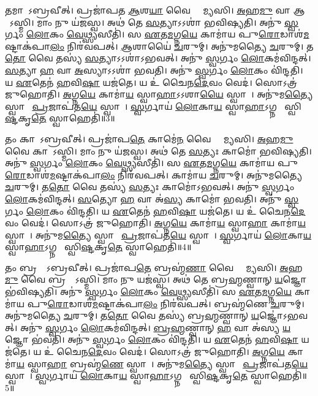    𑌤𑌮𑌾𑌶𑌾᳚𑌽𑌬𑍍𑌰𑌵𑍀𑌤𑍍।
   𑌪𑍍𑌰𑌜𑌾॑𑌪𑌤 \ul{𑌆}𑌶\ul{𑌯𑌾} 𑌵𑍈 𑌶𑍍𑌰𑌾᳚𑌮𑍍𑌯𑌸𑌿।
   \ul{𑌅}𑌹\ul{𑌮𑍁} 𑌵𑌾 𑌆𑌶𑌾᳚𑌽𑌸𑍍𑌮𑌿।
   𑌮𑌾𑌂 𑌨𑍁 𑌯॑𑌜𑌸𑍍𑌵।
   𑌅𑌥॑ 𑌤𑍇 \ul{𑌸}𑌤𑍍𑌯𑌾𑌽𑌽𑌶𑌾॑ 𑌭𑌵𑌿𑌷𑍍𑌯𑌤𑌿।
   𑌅𑌨𑍁॑ \ul{𑌸𑍍𑌵}𑌰𑍍𑌗𑌂 \ul{𑌲𑍋}𑌕𑌂 \ul{𑌵𑍇}𑌥𑍍𑌸𑍍𑌯𑌸𑍀𑌤𑌿॑।
   𑌸 \ul{𑌏}𑌤\ul{𑌮}𑌗𑍍𑌨\ul{𑌯𑍇} 𑌕𑌾𑌮𑌾॑𑌯 𑌪𑍁\ul{𑌰𑍋}𑌡𑌾𑌶॑\ul{𑌮}𑌷𑍍𑌟𑌾𑌕॑𑌪𑌾\ul{𑌲𑌂} 𑌨𑌿𑌰॑𑌵𑌪𑌤𑍍।
   \ul{𑌆}𑌶𑌾𑌯𑍈॑ \ul{𑌚}𑌰𑍁𑌮𑍍।
   𑌅𑌨𑍁॑𑌮𑌤𑍍𑌯𑍈 \ul{𑌚}𑌰𑍁𑌮𑍍।
   𑌤\ul{𑌤𑍋} 𑌵𑍈 𑌤𑌸𑍍𑌯॑ \ul{𑌸}𑌤𑍍𑌯𑌾𑌽𑌽𑌶𑌾॑𑌽𑌭𑌵𑌤𑍍।
   𑌅𑌨𑍁॑ \ul{𑌸𑍍𑌵}𑌰𑍍𑌗𑌂 \ul{𑌲𑍋}𑌕𑌮॑𑌵𑌿𑌨𑍍𑌦𑌤𑍍।
   \ul{𑌸}𑌤𑍍𑌯𑌾 \ul{𑌹} 𑌵𑌾 \ul{𑌅}𑌸𑍍𑌯𑌾𑌽𑌽𑌶𑌾॑ 𑌭𑌵𑌤𑌿।
   𑌅𑌨𑍁॑ \ul{𑌸𑍍𑌵}𑌰𑍍𑌗𑌂 \ul{𑌲𑍋}𑌕𑌂 𑌵𑌿॑𑌨𑍍𑌦𑌤𑌿।
   𑌯 \ul{𑌏}𑌤𑍇𑌨॑ \ul{𑌹}𑌵𑌿\ul{𑌷𑌾} 𑌯𑌜॑𑌤𑍇।
   𑌯 𑌉॑ 𑌚𑍈𑌨\ul{𑌦𑍇}𑌵𑌂 𑌵𑍇𑌦॑।
   𑌸𑍋𑌽𑌤𑍍𑌰॑ 𑌜𑍁𑌹𑍋𑌤𑌿।
   \ul{𑌅}𑌗𑍍𑌨\ul{𑌯𑍇} 𑌕𑌾𑌮𑌾॑\ul{𑌯} 𑌸𑍍𑌵𑌾\ul{𑌹𑌾}𑌽𑌽𑌶𑌾\ul{𑌯𑍈} 𑌸𑍍𑌵𑌾𑌹𑌾᳚।
   𑌅𑌨𑍁॑𑌮\ul{𑌤𑍍𑌯𑍈} 𑌸𑍍𑌵𑌾𑌹𑌾᳚ \ul{𑌪𑍍𑌰}𑌜𑌾𑌪॑𑌤\ul{𑌯𑍇} 𑌸𑍍𑌵𑌾𑌹𑌾᳚।
   \ul{𑌸𑍍𑌵}𑌰𑍍𑌗𑌾𑌯॑ \ul{𑌲𑍋}𑌕𑌾\ul{𑌯} 𑌸𑍍𑌵𑌾\ul{𑌹𑌾}𑌽𑌗𑍍𑌨𑌯𑍇᳚ 𑌸𑍍𑌵𑌿\ul{𑌷𑍍𑌟}𑌕𑍃\ul{𑌤𑍇} 𑌸𑍍𑌵𑌾𑌹𑍇𑌤𑌿॑॥3॥

   𑌤𑌂 𑌕𑌾𑌮𑍋᳚𑌽𑌬𑍍𑌰𑌵𑍀𑌤𑍍।
   𑌪𑍍𑌰𑌜𑌾॑𑌪\ul{𑌤𑍇} 𑌕𑌾𑌮𑍇॑\ul{𑌨} 𑌵𑍈 𑌶𑍍𑌰𑌾᳚𑌮𑍍𑌯𑌸𑌿।
   \ul{𑌅}𑌹\ul{𑌮𑍁} 𑌵𑍈 𑌕𑌾𑌮𑍋᳚𑌽𑌸𑍍𑌮𑌿।
   𑌮𑌾𑌂 𑌨𑍁 𑌯॑𑌜𑌸𑍍𑌵।
   𑌅𑌥॑ 𑌤𑍇 \ul{𑌸}𑌤𑍍𑌯𑌃 𑌕𑌾𑌮𑍋॑ 𑌭𑌵𑌿𑌷𑍍𑌯𑌤𑌿।
   𑌅𑌨𑍁॑ \ul{𑌸𑍍𑌵}𑌰𑍍𑌗𑌂 \ul{𑌲𑍋}𑌕𑌂 \ul{𑌵𑍇}𑌥𑍍𑌸𑍍𑌯𑌸𑍀𑌤𑌿॑।
   𑌸 \ul{𑌏}𑌤\ul{𑌮}𑌗𑍍𑌨\ul{𑌯𑍇} 𑌕𑌾𑌮𑌾॑𑌯 𑌪𑍁\ul{𑌰𑍋}𑌡𑌾𑌶॑\ul{𑌮}𑌷𑍍𑌟𑌾𑌕॑𑌪𑌾\ul{𑌲𑌂} 𑌨𑌿𑌰॑𑌵𑌪𑌤𑍍।
   𑌕𑌾𑌮𑌾॑𑌯 \ul{𑌚}𑌰𑍁𑌮𑍍।
   𑌅𑌨𑍁॑𑌮𑌤𑍍𑌯𑍈 \ul{𑌚}𑌰𑍁𑌮𑍍।
   𑌤\ul{𑌤𑍋} 𑌵𑍈 𑌤𑌸𑍍𑌯॑ \ul{𑌸}𑌤𑍍𑌯𑌃 𑌕𑌾𑌮𑍋॑𑌽𑌭𑌵𑌤𑍍।
   𑌅𑌨𑍁॑ \ul{𑌸𑍍𑌵}𑌰𑍍𑌗𑌂 \ul{𑌲𑍋}𑌕𑌮॑𑌵𑌿𑌨𑍍𑌦𑌤𑍍।
   \ul{𑌸}𑌤𑍍𑌯𑍋 \ul{𑌹} 𑌵𑌾 𑌅॑\ul{𑌸𑍍𑌯} 𑌕𑌾𑌮𑍋॑ 𑌭𑌵𑌤𑌿।
   𑌅𑌨𑍁॑ \ul{𑌸𑍍𑌵}𑌰𑍍𑌗𑌂 \ul{𑌲𑍋}𑌕𑌂 𑌵𑌿॑𑌨𑍍𑌦𑌤𑌿।
   𑌯 \ul{𑌏}𑌤𑍇𑌨॑ \ul{𑌹}𑌵𑌿\ul{𑌷𑌾} 𑌯𑌜॑𑌤𑍇।
   𑌯 𑌉॑ 𑌚𑍈𑌨\ul{𑌦𑍇}𑌵𑌂 𑌵𑍇𑌦॑।
   𑌸𑍋𑌽𑌤𑍍𑌰॑ 𑌜𑍁𑌹𑍋𑌤𑌿।
   \ul{𑌅}𑌗𑍍𑌨\ul{𑌯𑍇} 𑌕𑌾𑌮𑌾॑\ul{𑌯} 𑌸𑍍𑌵𑌾\ul{𑌹𑌾} 𑌕𑌾𑌮𑌾॑\ul{𑌯} 𑌸𑍍𑌵𑌾𑌹𑌾᳚।
   𑌅𑌨𑍁॑𑌮\ul{𑌤𑍍𑌯𑍈} 𑌸𑍍𑌵𑌾𑌹𑌾᳚ \ul{𑌪𑍍𑌰}𑌜𑌾𑌪॑𑌤\ul{𑌯𑍇} 𑌸𑍍𑌵𑌾𑌹𑌾᳚।
   \ul{𑌸𑍍𑌵}𑌰𑍍𑌗𑌾𑌯॑ \ul{𑌲𑍋}𑌕𑌾\ul{𑌯} 𑌸𑍍𑌵𑌾\ul{𑌹𑌾}𑌽𑌗𑍍𑌨𑌯𑍇᳚ 𑌸𑍍𑌵𑌿\ul{𑌷𑍍𑌟}𑌕𑍃\ul{𑌤𑍇} 𑌸𑍍𑌵𑌾𑌹𑍇𑌤𑌿॑॥4॥

   𑌤𑌂 𑌬𑍍𑌰𑌹𑍍𑌮𑌾᳚𑌽𑌬𑍍𑌰𑌵𑍀𑌤𑍍।
   𑌪𑍍𑌰𑌜𑌾॑𑌪\ul{𑌤𑍇} 𑌬𑍍𑌰𑌹𑍍𑌮॑\ul{𑌣𑌾} 𑌵𑍈 𑌶𑍍𑌰𑌾᳚𑌮𑍍𑌯𑌸𑌿।
   \ul{𑌅}𑌹\ul{𑌮𑍁} 𑌵𑍈 𑌬𑍍𑌰𑌹𑍍𑌮𑌾᳚𑌽𑌸𑍍𑌮𑌿।
   𑌮𑌾𑌂 𑌨𑍁 𑌯𑌜॑𑌸𑍍𑌵।
   𑌅𑌥॑ 𑌤𑍇 𑌬𑍍𑌰\ul{𑌹𑍍𑌮}𑌣𑍍𑌵𑌾𑌨𑍍 \ul{𑌯}𑌜𑍍𑌞𑍋 𑌭॑𑌵𑌿𑌷𑍍𑌯𑌤𑌿।
   𑌅𑌨𑍁॑ \ul{𑌸𑍍𑌵}𑌰𑍍𑌗𑌂 \ul{𑌲𑍋}𑌕𑌂 \ul{𑌵𑍇}𑌥𑍍𑌸𑍍𑌯𑌸𑍀𑌤𑌿॑।
   𑌸 \ul{𑌏}𑌤\ul{𑌮}𑌗𑍍𑌨\ul{𑌯𑍇} 𑌕𑌾𑌮𑌾॑𑌯 𑌪𑍁\ul{𑌰𑍋}𑌡𑌾𑌶॑\ul{𑌮}𑌷𑍍𑌟𑌾𑌕॑𑌪𑌾\ul{𑌲𑌂} 𑌨𑌿𑌰॑𑌵𑌪𑌤𑍍।
   𑌬𑍍𑌰𑌹𑍍𑌮॑𑌣𑍇 \ul{𑌚}𑌰𑍁𑌮𑍍।
   𑌅𑌨𑍁॑𑌮𑌤𑍍𑌯𑍈 \ul{𑌚}𑌰𑍁𑌮𑍍।
   𑌤\ul{𑌤𑍋} 𑌵𑍈 𑌤𑌸𑍍𑌯॑ 𑌬𑍍𑌰\ul{𑌹𑍍𑌮}𑌣𑍍𑌵𑌾𑌨𑍍 \ul{𑌯}𑌜𑍍𑌞𑍋॑𑌽𑌭𑌵𑌤𑍍।
   𑌅𑌨𑍁॑ \ul{𑌸𑍍𑌵}𑌰𑍍𑌗𑌂 \ul{𑌲𑍋}𑌕𑌮॑𑌵𑌿𑌨𑍍𑌦𑌤𑍍।
   \ul{𑌬𑍍𑌰}\ul{𑌹𑍍𑌮}𑌣𑍍𑌵𑌾𑌨𑍍 \ul{𑌹} 𑌵𑌾 𑌅॑𑌸𑍍𑌯 \ul{𑌯}𑌜𑍍𑌞𑍋 𑌭॑𑌵𑌤𑌿।
   𑌅𑌨𑍁॑ \ul{𑌸𑍍𑌵}𑌰𑍍𑌗𑌂 \ul{𑌲𑍋}𑌕𑌂 𑌵𑌿॑𑌨𑍍𑌦𑌤𑌿।
   𑌯 \ul{𑌏}𑌤𑍇𑌨॑ \ul{𑌹}𑌵𑌿\ul{𑌷𑌾} 𑌯𑌜॑𑌤𑍇।
   𑌯 𑌉॑ 𑌚𑍈𑌨\ul{𑌦𑍇}𑌵𑌂 𑌵𑍇𑌦॑।
   𑌸𑍋𑌽𑌤𑍍𑌰॑ 𑌜𑍁𑌹𑍋𑌤𑌿।
   \ul{𑌅}𑌗𑍍𑌨\ul{𑌯𑍇} 𑌕𑌾𑌮𑌾॑\ul{𑌯} 𑌸𑍍𑌵𑌾\ul{𑌹𑌾} 𑌬𑍍𑌰𑌹𑍍𑌮॑\ul{𑌣𑍇} 𑌸𑍍𑌵𑌾𑌹𑌾᳚।
   𑌅𑌨𑍁॑𑌮\ul{𑌤𑍍𑌯𑍈} 𑌸𑍍𑌵𑌾𑌹𑌾᳚ \ul{𑌪𑍍𑌰}𑌜𑌾𑌪॑𑌤\ul{𑌯𑍇} 𑌸𑍍𑌵𑌾𑌹𑌾᳚।
   \ul{𑌸𑍍𑌵}𑌰𑍍𑌗𑌾𑌯॑ \ul{𑌲𑍋}𑌕𑌾\ul{𑌯} 𑌸𑍍𑌵𑌾\ul{𑌹𑌾}𑌽𑌗𑍍𑌨𑌯𑍇᳚ 𑌸𑍍𑌵𑌿\ul{𑌷𑍍𑌟}𑌕𑍃\ul{𑌤𑍇} 𑌸𑍍𑌵𑌾𑌹𑍇𑌤𑌿॑॥5॥

